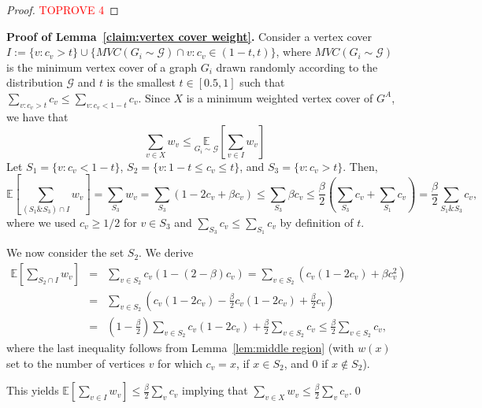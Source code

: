 \documentclass[11pt]{article}
\newcommand{\E}[0]{\ensuremath{\mathbb{E}}}
\begin{document}
\label{app:middle region}
\begin{proof}\textcolor{red}{TOPROVE 4}\end{proof} 

\noindent\textbf{Proof of Lemma~\ref{claim:vertex cover weight}.}
Consider a vertex cover $I := \{ v : c_v > t \} \cup \{MVC(G_i \sim \mathcal{G}) \cap v :
    c_v \in (1-t , t) \}$, where $MVC(G_i \sim \mathcal{G})$ is the
    minimum vertex cover of a graph $G_i$ drawn randomly according to the distribution
    $\mathcal{G}$ and $t$ is the smallest $t \in [0.5, 1]$ such that
    $\sum_{v : c_v > t} c_v \leq \sum_{v: c_v < 1-t} c_v.$
    Since $X$ is a minimum weighted vertex cover of $G^A$, we have that 
    \[\sum_{v \in X} w_v \leq \underset{G_i \sim \mathcal{G}}{\E}[\sum_{v \in I} w_v]\]
    Let $S_1 = \{v: c_v < 1-t\}$, $S_2 = \{v: 1-t \le c_v \le t\}$, and $S_3 = \{v: c_v > t\}$.  Then,
\[\E \left[\sum_{(S_1 \& S_3) \cap I} w_v\right] = \sum_{S_3} w_v = \sum_{S_3} (1 - 2c_v + \beta c_v) \leq \sum_{S_3} \beta c_v \leq \frac{\beta}{2} \left(\sum_{S_3} c_v + \sum_{S_1} c_v\right) = \frac{\beta}{2} \sum_{S_1 \& S_3} c_v,\]
    where we used $c_v \ge 1/2$ for $v \in S_3$ and $\sum_{S_3} c_v \leq \sum_{S_1} c_v$ by definition of $t$.


    We now consider the set $S_2$.  We derive
    \begin{eqnarray*}
      \E \left[\sum_{S_2 \cap I} w_v\right] & = & \sum_{v \in S_2} c_v(1 - (2-\beta)c_v) = \sum_{v \in S_2} \left(c_v(1 - 2c_v) + \beta c_v^2\right)\\
      & = & \sum_{v \in S_2} \left(c_v(1 - 2c_v) - \frac{\beta}{2} c_v(1-2c_v) + \frac{\beta}{2} c_v\right)\\
      & = & \left(1 - \frac{\beta}{2}\right) \sum_{v \in S_2} c_v(1 - 2c_v) + \frac{\beta}{2} \sum_{v \in S_2} c_v
      \le \frac{\beta}{2} \sum_{v \in S_2} c_v,
    \end{eqnarray*}
    where the last inequality follows from Lemma~\ref{lem:middle
      region} (with $w(x)$ set to the number of vertices $v$ for which
    $c_v = x$, if $x \in S_2$, and 0 if $x \notin S_2$).

    This yields ${\E}[\sum_{v \in I} w_v] \le \frac{\beta}{2} \sum_{v} c_v$
    implying that $\sum_{v \in X} w_v \le \frac{\beta}{2} \sum_{v}
    c_v$.\qed





  \newcommand{\eps}{\varepsilon}
\end{document}
